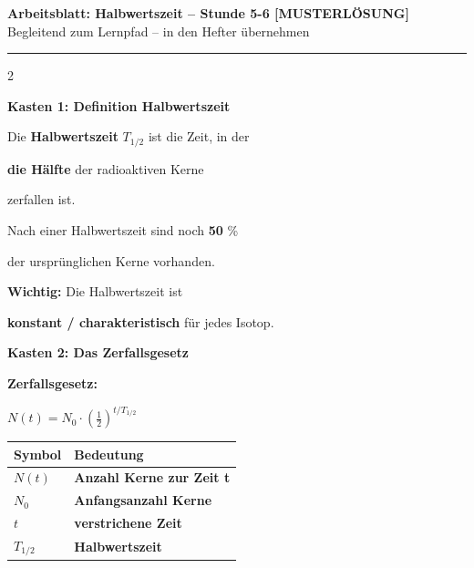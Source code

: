 \documentclass[10pt, a4paper]{article}
\newcommand{\fachfarbe}{physik}
\newcommand{\thema}{Halbwertszeit}
\newcommand{\stunde}{Stunde 5-6}
\newcommand{\lsg}[1]{\textcolor{loesung}{\textbf{#1}}}
\newcommand{\abschnitt}[1]{%
    \vspace{8pt}\noindent\textbf{\textcolor{\fachfarbe}{#1}}\vspace{4pt}
}
\begin{document}
\begin{center}
{\large\bfseries Arbeitsblatt: \thema{} -- \stunde{} \textcolor{loesung}{[MUSTERLÖSUNG]}}\\[2pt]
{\small\textcolor{grau}{Begleitend zum Lernpfad -- in den Hefter übernehmen}}
\end{center}
\vspace{-2pt}\hrule\vspace{8pt}

\begin{multicols}{2}
\small


\abschnitt{Kasten 1: Definition Halbwertszeit}

\begin{merksatz}[Grundbegriff]
Die \textbf{Halbwertszeit} $T_{1/2}$ ist die Zeit, in der

\lsg{die Hälfte} der radioaktiven Kerne

zerfallen ist.

\vspace{6pt}

Nach einer Halbwertszeit sind noch \lsg{50} \%

der ursprünglichen Kerne vorhanden.

\vspace{6pt}

\textbf{Wichtig:} Die Halbwertszeit ist

\lsg{konstant / charakteristisch} für jedes Isotop.
\end{merksatz}

\vspace{6pt}


\abschnitt{Kasten 2: Das Zerfallsgesetz}

\begin{merksatz}[Formel]
\textbf{Zerfallsgesetz:}

\vspace{6pt}

$N(t) = N_0 \cdot \left(\frac{1}{2}\right)^{t/T_{1/2}}$

\vspace{6pt}

\renewcommand{\arraystretch}{1.4}
\begin{tabular}{|l|l|}
\hline
\textbf{Symbol} & \textbf{Bedeutung} \\
\hline
$N(t)$ & \lsg{Anzahl Kerne zur Zeit t} \\
\hline
$N_0$ & \lsg{Anfangsanzahl Kerne} \\
\hline
$t$ & \lsg{verstrichene Zeit} \\
\hline
$T_{1/2}$ & \lsg{Halbwertszeit} \\
\hline
\end{tabular}
\renewcommand{\arraystretch}{1}
\end{merksatz}


\end{multicols}
\end{document}
